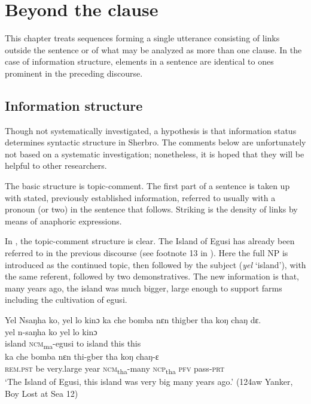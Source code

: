 \chapter{Beyond the clause}
\label{ch:9}\hypertarget{Toc115517819}{}
This chapter treats sequences forming a single utterance consisting of links outside the sentence or of what may be analyzed as more than one clause. In the case of information structure, elements in a sentence are identical to ones prominent in the preceding discourse.

\section{Information structure}
\label{sec:9.1}\hypertarget{Toc115517820}{}
Though not systematically investigated, a hypothesis is that information status determines syntactic structure in Sherbro. The comments below are unfortunately not based on a systematic investigation; nonetheless, it is hoped that they will be helpful to other researchers.

The basic structure is topic-comment. The first part of a sentence is taken up with stated, previously established information, referred to usually with a pronoun (or two) in the sentence that follows. Striking is the density of links by means of anaphoric expressions.

In , the topic-comment structure is clear. The Island of Egusi has already been referred to in the previous discourse (see footnote 13 in ). Here the full NP is introduced as the continued topic, then followed by the subject (\textit{yel} ‘island'), with the same referent, followed by two demonstratives. The new information is that, many years ago, the island was much bigger, large enough to support farms including the cultivation of egusi.

\ea%
    \label{ex:224}

    Yel Nsaŋha ko, yel lo kinɔ ka che bomba nɛn thigber tha koŋ chaŋ dɛ.\\
    \gll yel    n-saŋha        ko    yel    lo    kinɔ\\
    island    \textsc{ncm}\textsubscript{ma}{}-egusi    to    island    this  this\\
    \gll ka      che  bomba    nɛn  thi-gber      tha    koŋ  chaŋ-ɛ\\
    \textsc{rem.pst}  be    very.large  year  \textsc{ncm}\textsubscript{tha}{}-many  \textsc{ncp}\textsubscript{tha}    \textsc{pfv}  pass-\textsc{prt}\\
    \glt ‘The Island of Egusi, this island was very big many years ago.' (124aw Yanker, Boy Lost at Sea 12)
\z

